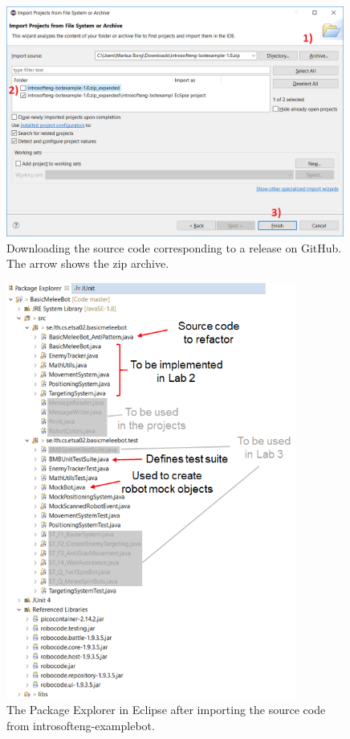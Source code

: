 \documentclass{scrreprt}
\begin{document}
\begin{figure}
\centering
\includegraphics[width=0.99\textwidth]{figures/Eclipse-import.png}
\caption{Downloading the source code corresponding to a release on GitHub. The arrow shows the zip archive.}
\label{fig:eclipse-import}
\end{figure}

\begin{figure}
\centering
\includegraphics[width=0.85\textwidth]{figures/packageExplorerAfterImport.png}
\caption{The Package Explorer in Eclipse after importing the source code from introsofteng-examplebot.}
\label{fig:afterImport}
\end{figure}
\end{document}
